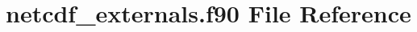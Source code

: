 \hypertarget{netcdf__externals_8f90}{}\section{netcdf\+\_\+externals.\+f90 File Reference}
\label{netcdf__externals_8f90}
